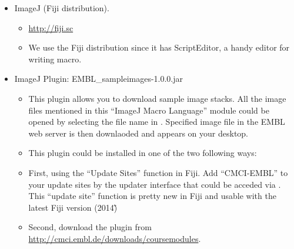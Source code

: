 
\begin{itemize}
  \item ImageJ (Fiji distribution).
  \begin{itemize}
    \item \url{http://fiji.sc}
    \item We use the Fiji distribution since it has ScriptEditor, a handy editor for writing macro. 
  \end{itemize}
  \item ImageJ Plugin: EMBL\_sampleimages-1.0.0.jar
  \begin{itemize}
     \item This plugin allows you to download sample image stacks. All the image files mentioned in this ``ImageJ Macro Language'' module could be opened by selecting the file name in . Specified image file in the EMBL web server is then downlaoded and appears on your desktop.
    \item This plugin could be installed in one of the two following ways:
    \item First, using the ``Update Sites'' function in Fiji. Add ``CMCI-EMBL'' to your update sites by the updater interface that could be acceded via . This ``update site'' function is pretty new in Fiji and usable with the latest Fiji version (2014\~)        
    \item Second, download the plugin from \url{http://cmci.embl.de/downloads/coursemodules}. 
  \end{itemize}
\end{itemize}
